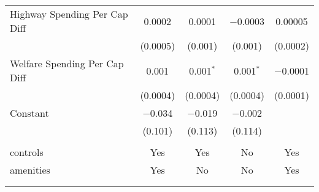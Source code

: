 \begin{table}[!htbp]
\begin{tabular}{@{\extracolsep{5pt}}lcccc}
  Highway Spending Per Cap Diff & 0.0002 & 0.0001 & $-$0.0003 & 0.00005 \\ 
  & (0.0005) & (0.001) & (0.001) & (0.0002) \\ 
  Welfare Spending Per Cap Diff & 0.001 & 0.001$^{*}$ & 0.001$^{*}$ & $-$0.0001 \\ 
  & (0.0004) & (0.0004) & (0.0004) & (0.0001) \\ 
  Constant & $-$0.034 & $-$0.019 & $-$0.002 &  \\ 
  & (0.101) & (0.113) & (0.114) &  \\ 
 \hline \\[-1.8ex] 
controls & Yes & Yes & No & Yes \\ 
amenities & Yes & No & No & Yes \\ 
\hline \\[-1.8ex] 
\hline 
\hline \\[-1.8ex] 
\end{tabular} 
\end{table} 
